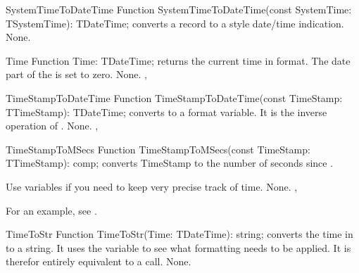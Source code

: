 

\begin{function}{SystemTimeToDateTime}
\Declaration
Function SystemTimeToDateTime(const SystemTime: TSystemTime): TDateTime;
\Description
{} converts a  record to a
 style date/time indication.
\Errors
None.
\SeeAlso
{}
\end{function}



\begin{function}{Time}
\Declaration
Function Time: TDateTime;
\Description
{} returns the current time in  format. The date
part of the  is set to zero.
\Errors
None.
\SeeAlso
{}, 
\end{function}



 
\begin{function}{TimeStampToDateTime}
\Declaration
Function TimeStampToDateTime(const TimeStamp: TTimeStamp): TDateTime;
\Description
{} converts  to a 
format variable. It is the inverse operation of .
\Errors
None.
\SeeAlso
{}, 
\end{function}



\begin{function}{TimeStampToMSecs}
\Declaration
Function TimeStampToMSecs(const TimeStamp: TTimeStamp): comp;
\Description
{} converts {TimeStamp} to the number of seconds
since .

Use  variables if you need to keep very precise track of
time.
\Errors
None.
\SeeAlso
{}, 
\end{function}

For an example, see .

\begin{function}{TimeToStr}
\Declaration
Function TimeToStr(Time: TDateTime): string;
\Description
{} converts the time in  to a string. It uses
the  variable to see what formatting needs to be
applied. It is therefor entirely equivalent to a
 call.
\Errors
None.
\SeeAlso
\end{function}

